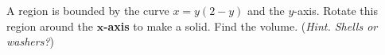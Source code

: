 A region is bounded by the curve $x = y(2-y)$ and the $y$-axis.  Rotate this region around the \textbf{$\mathbf{x}$-axis} to make a solid.  Find the volume.  (\emph{Hint.  Shells or washers?})
